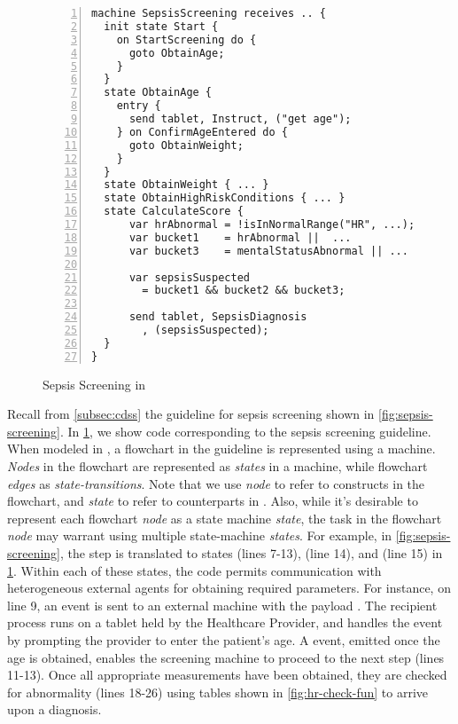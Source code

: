 \begin{figure}[t]
  \begin{lstlisting}[style=mediksty, language=medik,  multicols=2,
  basicstyle=\ttfamily\tiny, numbers=left
  ,showspaces=false
  ,xleftmargin=2em]
machine SepsisScreening receives .. {
  init state Start {
    on StartScreening do {
      goto ObtainAge;
    }
  }
  state ObtainAge {
    entry {
      send tablet, Instruct, ("get age");
    } on ConfirmAgeEntered do {
      goto ObtainWeight;
    }
  }
  state ObtainWeight { ... }
  state ObtainHighRiskConditions { ... }
  state CalculateScore {
      var hrAbnormal = !isInNormalRange("HR", ...);
      var bucket1    = hrAbnormal ||  ...
      var bucket3    = mentalStatusAbnormal || ...

      var sepsisSuspected
        = bucket1 && bucket2 && bucket3;

      send tablet, SepsisDiagnosis
        , (sepsisSuspected);
  }
}
\end{lstlisting}
  \caption{Sepsis Screening in \MediK{}}\label{fig:medik-sepsis-screening}
\end{figure}

Recall from \ref{subsec:cdss} the guideline for sepsis screening shown in
\figurename{} \ref{fig:sepsis-screening}.
In \figurename{} \ref{fig:medik-sepsis-screening}, we show
\MediK{} code corresponding to the sepsis screening guideline.
When modeled in \MediK{}, a flowchart in the guideline is represented using
a \MediK{} machine. \emph{Nodes} in the flowchart are represented as
\emph{states} in a \MediK{} machine, while flowchart \emph{edges} as \emph{state-transitions}.
Note that we use \emph{node} to refer to constructs
in the flowchart, and \emph{state} to refer to counterparts in \MediK{}.
Also, while it's desirable to represent each flowchart \emph{node} as a
state machine \emph{state}, the task in the flowchart \emph{node} may warrant using
multiple state-machine \emph{states}. For example,
in \figurename{} \ref{fig:sepsis-screening}, the step  is translated to states  (lines
7-13),  (line 14), and
 (line 15) in \figurename{} \ref{fig:medik-sepsis-screening}.
Within each of these states, the code
permits communication with heterogeneous external agents for obtaining
required parameters. For instance, on line 9, an
 event is sent to an external  machine
with the payload . The recipient process
runs on a tablet held by the Healthcare Provider, and handles
the event by prompting the provider to enter the patient's age.
A  event, emitted once the age
is obtained, enables the screening machine to proceed to the next
step (lines 11-13). Once all appropriate measurements have been obtained,
they are checked for abnormality (lines 18-26) using tables shown in \figurename{}
\ref{fig:hr-check-fun} to arrive upon a diagnosis.

